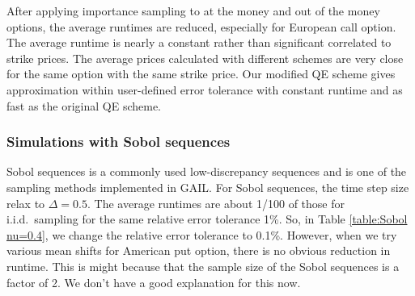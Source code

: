 \documentclass{ws-ijfe}
\begin{document}
After applying importance sampling to at the money and out of the money options, the average runtimes are reduced, especially for European call option. The average runtime is nearly a constant rather than significant correlated to strike prices. The average prices calculated with different schemes are very close for the same option with the same strike price. Our modified QE scheme gives approximation within user-defined error tolerance with constant runtime and as fast as the original QE scheme.

\subsubsection{Simulations with Sobol sequences}
Sobol sequences is a commonly used low-discrepancy sequences and is one of the sampling methods implemented in GAIL. For Sobol sequences, the time step size relax to $\Delta = 0.5$. The average runtimes are about 1/100 of those for i.i.d.\  sampling for the same relative error tolerance 1\%. So, in Table \ref{table:Sobol nu=0.4}, we change the relative error tolerance to 0.1\%. However, when we try various mean shifts for American put option, there is no obvious reduction in runtime. This is might because that the sample size of the Sobol sequences is a factor of 2. We don't have a good explanation for this now.
\begin{table}[h]
\caption{Test of option price with  Sobol' points}
\centering
\label{table:Sobol nu=0.4}
\end{table}
\end{document}
